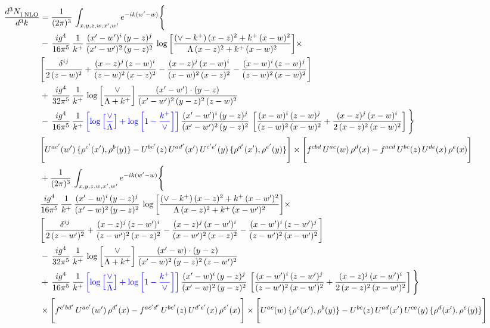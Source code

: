 \documentclass[9pt]{article}
\numberwithin{equation}{section}
\begin{document}
\begin{align}
 \frac{d^{3}N_{1\,\rm NLO}^{\rm}}{d^{3}k}  & =    \frac{1}{(2\pi)^{3}}\,\int_{x,y,z,w,x',w^{\prime}} e^{-ik(w^{\prime}-w)}\Bigg\{ \notag \\ & -\, \frac{ig^{4}}{16\pi^{5}}\,\frac{1}{k^{+}}\, \frac{(x'-w')^{i}\,(y-z)^{j}}{(x'-w')^{2}\,(y-z)^{2}}\,\log{\left[\frac{(\vee-k^{+})\,(x-z)^{2}+k^{+}\,(x-w)^{2}}{\Lambda\, (x-z)^{2}+k^{+}\,(x-w)^{2}}\right]}\times\notag \\ &  \Bigg[\frac{\delta^{ij}}{2\,(z-w)^{2}}+\frac{(x-z)^{j}\,(z-w)^{i}}{(z-w)^{2}\,(x-z)^{2}}-\frac{(x-z)^{j}\,(x-w)^{i}}{(x-w)^{2}\,(x-z)^{2}}-\frac{(x-w)^{i}\,(z-w)^{j}}{(z-w)^{2}\,(x-w)^{2}}\Bigg]\notag \\ & +\,\frac{ig^{4}}{32\pi^{5}}\,\frac{1}{k^{+}}\,\log{\left[\frac{\vee}{\Lambda + k^{+}}\right]}\, \frac{(x'-w')\cdot (y-z)}{(x'-w')^{2}\,(y-z)^{2}\,(z-w)^{2}}\notag \\ & -\, \frac{ig^{4}}{16\pi^{5}}\,\frac{1}{k^{+}}\,{\color{blue}\left[\log{\left[\frac{\vee}{\Lambda}\right]} + \log{\left[1-\frac{k^{+}}{\vee}\right]}\right]}\,\frac{(x'-w')^{i}\,(y-z)^{j}}{(x'-w')^{2}\,(y-z)^{2}}\,\left[\frac{(x-w)^{i}\,(z-w)^{j}}{(z-w)^{2}\,(x-w)^{2}}+\frac{(x-z)^{j}\,(x-w)^{i}}{2\,(x-z)^{2}\, (x-w)^{2}}\right]\Bigg\} \notag \\ & \Bigg[U^{ac'}(w')\,\{\rho^{c'}(x'),\rho^{b}(y)\}-U^{bc'}(z)\,U^{ad'}(x')\,U^{c'e'}(y)\, \{\rho^{d'}(x'),\rho^{e'}(y)\}\Bigg]\times \Bigg[f^{cbd}\,U^{ac}(w)\,\rho^{d}(x)-f^{acd}\, U^{bc}(z)\,U^{de}(x)\,\rho^{e}(x)\Bigg]\notag \\ & + \frac{1}{(2\pi)^{3}}\,\int_{x,y,z,w,x',w^{\prime}} e^{-ik(w^{\prime}-w)}\Bigg\{ \notag \\ &  \frac{ig^{4}}{16\pi^{5}}\,\frac{1}{k^{+}}\, \frac{(x'-w)^{i}\,(y-z)^{j}}{(x'-w)^{2}\,(y-z)^{2}}\,\log{\left[\frac{(\vee-k^{+})\,(x-z)^{2}+k^{+}\,(x-w')^{2}}{\Lambda\, (x-z)^{2} + k^{+}\,(x-w')^{2}}\right]}\times\notag \\ &  \Bigg[\frac{\delta^{ij}}{2\,(z-w')^{2}}+\frac{(x-z)^{j}\,(z-w')^{i}}{(z-w')^{2}\,(x-z)^{2}}-\frac{(x-z)^{j}\,(x-w')^{i}}{(x-w')^{2}\,(x-z)^{2}}-\frac{(x-w')^{i}\,(z-w')^{j}}{(z-w')^{2}\,(x-w')^{2}}\Bigg]\notag \\ & -\,\frac{ig^{4}}{32\pi^{5}}\,\frac{1}{k^{+}}\,\log{\left[\frac{\vee}{\Lambda + k^{+}}\right]}\, \frac{(x'-w)\cdot (y-z)}{(x'-w)^{2}\,(y-z)^{2}\,(z-w')^{2}}\notag \\ & +\,\frac{ig^{4}}{16\pi^{5}}\,\frac{1}{k^{+}}\,{\color{blue}\left[\log{\left[\frac{\vee}{\Lambda}\right]} + \log{\left[1-\frac{k^{+}}{\vee}\right]}\right]}\,\frac{(x'-w)^{i}\,(y-z)^{j}}{(x'-w)^{2}\,(y-z)^{2}}\,\left[\frac{(x-w')^{i}\,(z-w')^{j}}{(z-w')^{2}\,(x-w')^{2}}+\frac{(x-z)^{j}\,(x-w')^{i}}{2\,(x-z)^{2}\, (x-w')^{2}}\right] \Bigg\} \notag \\ & \times\Bigg[f^{c'bd'}\,U^{ac'}(w')\,\rho^{d'}(x)-f^{ac'd'}\, U^{bc'}(z)\,U^{d'e'}(x)\,\rho^{e'}(x)\Bigg] \times \Bigg[U^{ac}(w)\,\{\rho^{c}(x'),\rho^{b}(y)\}-U^{bc}(z)\,U^{ad}(x')\,U^{ce}(y)\, \{\rho^{d}(x'),\rho^{e}(y)\}\Bigg]
\end{align}
\end{document}
